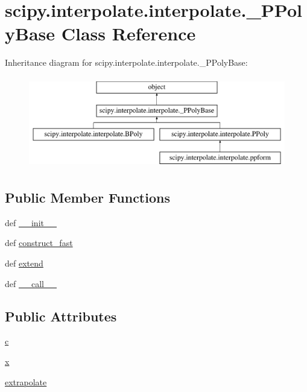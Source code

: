 \hypertarget{classscipy_1_1interpolate_1_1interpolate_1_1__PPolyBase}{}\section{scipy.\+interpolate.\+interpolate.\+\_\+\+P\+Poly\+Base Class Reference}
\label{classscipy_1_1interpolate_1_1interpolate_1_1__PPolyBase}
Inheritance diagram for scipy.\+interpolate.\+interpolate.\+\_\+\+P\+Poly\+Base\+:\begin{figure}[H]
\begin{center}
\leavevmode
\includegraphics[height=4.000000cm]{classscipy_1_1interpolate_1_1interpolate_1_1__PPolyBase}
\end{center}
\end{figure}
\subsection*{Public Member Functions}
\begin{DoxyCompactItemize}
\item 
def \hyperlink{classscipy_1_1interpolate_1_1interpolate_1_1__PPolyBase_ad51d5e56b1f67065c8290f41770d900c}{\+\_\+\+\_\+init\+\_\+\+\_\+}
\item 
def \hyperlink{classscipy_1_1interpolate_1_1interpolate_1_1__PPolyBase_a32c659d82a72e5f8fcd1de51ce62d1c4}{construct\+\_\+fast}
\item 
def \hyperlink{classscipy_1_1interpolate_1_1interpolate_1_1__PPolyBase_a46f074c851478ec5fe44ac1e54aef47a}{extend}
\item 
def \hyperlink{classscipy_1_1interpolate_1_1interpolate_1_1__PPolyBase_a314051da518e45a73efd354a8eef5b67}{\+\_\+\+\_\+call\+\_\+\+\_\+}
\end{DoxyCompactItemize}
\subsection*{Public Attributes}
\begin{DoxyCompactItemize}
\item 
\hyperlink{classscipy_1_1interpolate_1_1interpolate_1_1__PPolyBase_a63738e69e006c8810b6f7c0b7f5166a7}{c}
\item 
\hyperlink{classscipy_1_1interpolate_1_1interpolate_1_1__PPolyBase_a55ad7595d1d8cf0d01ac327bb280c781}{x}
\item 
\hyperlink{classscipy_1_1interpolate_1_1interpolate_1_1__PPolyBase_ae956a6a4fe79cae71fa2d89c4a85e821}{extrapolate}
\end{DoxyCompactItemize}


